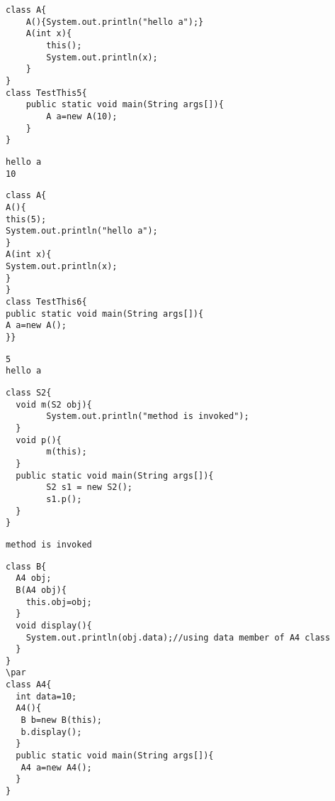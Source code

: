 \documentclass{book}
\def\lthtmlcheckvsize{\ifdim\ht\sizebox<\vsize 
  \ifdim\wd\sizebox<\hsize\expandafter\hfill\fi \expandafter\vfill
  \else\expandafter\vss\fi}%
\begin{document}
{\newpage\clearpage
{}%
\begin{lstlisting}
class A{  
	A(){System.out.println("hello a");}  
	A(int x){  
		this();  
		System.out.println(x);  
	}  
}  
class TestThis5{  
	public static void main(String args[]){  
		A a=new A(10);  
	}
}  
\end{lstlisting}%
\lthtmlfigureZ
\lthtmlcheckvsize\clearpage}

{\newpage\clearpage
{}%
\begin{lstlisting}
hello a
10
\end{lstlisting}%
\lthtmlfigureZ
\lthtmlcheckvsize\clearpage}

{\newpage\clearpage
{}%
\begin{lstlisting}
class A{  
A(){  
this(5);  
System.out.println("hello a");  
}  
A(int x){  
System.out.println(x);  
}  
}  
class TestThis6{  
public static void main(String args[]){  
A a=new A();  
}}  
\end{lstlisting}%
\lthtmlfigureZ
\lthtmlcheckvsize\clearpage}

{\newpage\clearpage
{}%
\begin{lstlisting}
5
hello a
\end{lstlisting}%
\lthtmlfigureZ
\lthtmlcheckvsize\clearpage}

{\newpage\clearpage
{}%
\begin{lstlisting}
class S2{  
  void m(S2 obj){  
		System.out.println("method is invoked");  
  }  
  void p(){  
		m(this);  
  }  
  public static void main(String args[]){  
		S2 s1 = new S2();  
		s1.p();  
  }  
}  
\end{lstlisting}%
\lthtmlfigureZ
\lthtmlcheckvsize\clearpage}

{\newpage\clearpage
{}%
\begin{lstlisting}
method is invoked
\end{lstlisting}%
\lthtmlfigureZ
\lthtmlcheckvsize\clearpage}

{\newpage\clearpage
{}%
\begin{lstlisting}
class B{  
  A4 obj;  
  B(A4 obj){  
    this.obj=obj;  
  }  
  void display(){  
    System.out.println(obj.data);//using data member of A4 class  
  }  
}  
\par
class A4{  
  int data=10;  
  A4(){  
   B b=new B(this);  
   b.display();  
  }  
  public static void main(String args[]){  
   A4 a=new A4();  
  }  
}  
\end{lstlisting}%
\lthtmlfigureZ
\lthtmlcheckvsize\clearpage}
\end{document}
